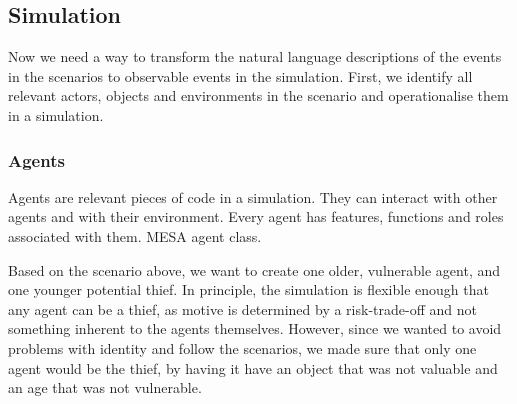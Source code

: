 \documentclass[11pt]{article}
\begin{document}



\subsection{Simulation}		%

Now we need a way to transform the natural language descriptions of the events in the scenarios to observable events in the simulation. First, we identify all relevant actors, objects and environments in the scenario and operationalise them in a simulation.



\subsubsection{Agents} 

Agents are relevant pieces of code in a simulation. They can interact with other agents and with their environment. Every agent has features, functions and roles associated with them. MESA agent class.

Based on the scenario above, we want to create one older, vulnerable agent, and one younger potential thief. In principle, the simulation is flexible enough that any agent can be a thief, as motive is determined by a risk-trade-off and not something inherent to the agents themselves. However, since we wanted to avoid problems with identity and follow the scenarios, we made sure that only one agent would be the thief, by having it have an object that was not valuable and an age that was not vulnerable.
\end{document}
